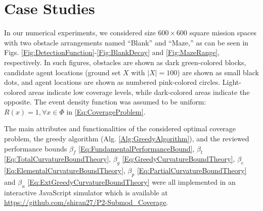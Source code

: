 \documentclass[letterpaper, 10 pt, conference]{ieeeconf}
\begin{document}



 

\section{Case Studies}
\label{Sec:CaseStudies}





In our numerical experiments, we considered size $600 \times 600$ square mission spaces with two obstacle arrangements named ``Blank'' and  ``Maze,'' as can be seen in Figs. \ref{Fig:DetectionFunction}-\ref{Fig:BlankDecay} and \ref{Fig:MazeRange}, respectively. In such figures, obstacles are shown as dark green-colored blocks, candidate agent locations (ground set $X$ with $\vert X \vert=100$) are shown as small black dots, and agent locations are shown as numbered pink-colored circles. Light-colored areas indicate low coverage levels, while dark-colored areas indicate the opposite. The event density function was assumed to be uniform: $R(x) = 1, \forall x\in \Phi$ in \eqref{Eq:CoverageProblem}.  




The main attributes and functionalities of the considered optimal coverage problem, the greedy algorithm (Alg. \ref{Alg:GreedyAlgorithm}), and the reviewed performance bounds $\beta_f$ \eqref{Eq:FundamentalPerformanceBound}, $\beta_t$ \eqref{Eq:TotalCurvatureBoundTheory}, $\beta_g$ \eqref{Eq:GreedyCurvatureBoundTheory}, $\beta_e$ \eqref{Eq:ElementalCurvatureBoundTheory}, $\beta_p$ \eqref{Eq:PartialCurvatureBoundTheory} and $\beta_u$ \eqref{Eq:ExtGreedyCurvatureBoundTheory} were all implemented in an interactive JavaScript simulator which is available at \url{https://github.com/shiran27/P2-Submod_Coverage}. 
\end{document}
